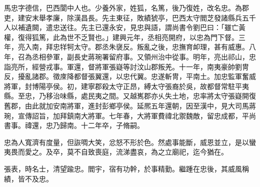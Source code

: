 \begin{pinyinscope}
 
 
 馬忠字德信，巴西閬中人也。少養外家，姓狐，名篤，後乃復姓，改名忠。為郡吏，建安末舉孝廉，除漢昌長。先主東征，敗績猇亭，巴西太守閻芝發諸縣兵五千人以補遺闕，遣忠送往。先主已還永安，見忠與語，謂尚書令劉巴曰：「雖亡黃權，復得狐篤，此為世不乏賢也。」建興元年，丞相亮開府，以忠為門下督。三年，亮入南，拜忠䍧牱太守。郡丞朱襃反。叛亂之後，忠撫育卹理，甚有威惠。八年，召為丞相參軍，副長史蔣琬署留府事。又領州治中從事。明年，亮出祁山，忠詣亮所，經營戎事。軍還，督將軍張嶷等討汶山郡叛羌。十一年，南夷豪帥劉冑反，擾亂諸郡。徵庲降都督張翼還，以忠代翼。忠遂斬冑，平南土。加忠監軍奮威將軍，封博陽亭侯。初，建寧郡殺太守正昂，縛太守張裔於吳，故都督常駐平夷縣。至忠，乃移治味縣，處民夷之間。又越嶲郡亦乆失土地，忠率將太守張嶷開復舊郡，由此就加安南將軍，進封彭鄉亭侯。延熈五年還朝，因至漢中，見大司馬蔣琬，宣傳詔旨，加拜鎮南大將軍。七年春，大將軍費禕北禦魏敵，留忠成都，平尚書事。禕還，忠乃歸南。十二年卒，子脩嗣。
 
 
 
 
 
 
 忠為人寬濟有度量，但詼啁大笑，忿怒不形於色。然處事能斷，威恩並立，是以蠻夷畏而愛之。及卒，莫不自致喪庭，流涕盡哀，為之立廟祀，迄今猶在。
 
 
張表，時名士，清望踰忠。閻宇，宿有功幹，於事精勤。繼踵在忠後，其威風稱績，皆不及忠。
 
 
\end{pinyinscope}
